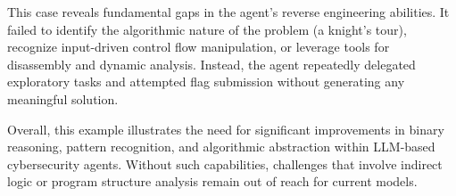 This case reveals fundamental gaps in the agent’s reverse engineering abilities. It failed to identify the algorithmic nature of the problem (a knight’s tour), recognize input-driven control flow manipulation, or leverage tools for disassembly and dynamic analysis. Instead, the agent repeatedly delegated exploratory tasks and attempted flag submission without generating any meaningful solution.

Overall, this example illustrates the need for significant improvements in binary reasoning, pattern recognition, and algorithmic abstraction within LLM-based cybersecurity agents. Without such capabilities, challenges that involve indirect logic or program structure analysis remain out of reach for current models.




